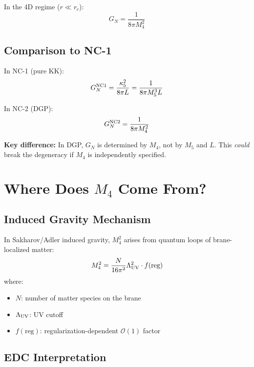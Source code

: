 \documentclass[11pt,a4paper]{article}
\theoremstyle{definition}
\begin{document}
In the 4D regime ($r \ll r_c$):
\begin{equation}
\boxed{G_N = \frac{1}{8\pi M_4^2}}
\label{eq:gn_dgp}
\end{equation}

\subsection{Comparison to NC-1}

In NC-1 (pure KK):
\begin{equation}
G_N^{\rm NC1} = \frac{\kappa_5^2}{8\pi L} = \frac{1}{8\pi M_5^3 L}
\end{equation}

In NC-2 (DGP):
\begin{equation}
G_N^{\rm NC2} = \frac{1}{8\pi M_4^2}
\end{equation}

\textbf{Key difference:} In DGP, $G_N$ is determined by $M_4$, not by $M_5$
and $L$. This \textit{could} break the degeneracy if $M_4$ is independently
specified.

\section{Where Does $M_4$ Come From?}

\subsection{Induced Gravity Mechanism}

In Sakharov/Adler induced gravity, $M_4^2$ arises from quantum loops of
brane-localized matter:
\begin{equation}
M_4^2 = \frac{N}{16\pi^2} \Lambda_{\rm UV}^2 \cdot f(\text{reg})
\label{eq:m4_induced}
\end{equation}
where:
\begin{itemize}
\item $N$: number of matter species on the brane
\item $\Lambda_{\rm UV}$: UV cutoff
\item $f(\text{reg})$: regularization-dependent $\mathcal{O}(1)$ factor
\end{itemize}

\subsection{EDC Interpretation}
\end{document}
